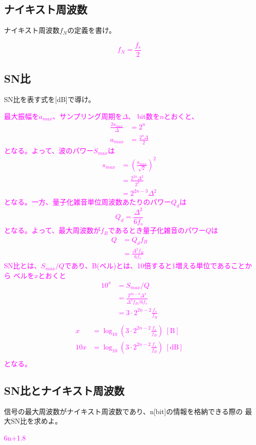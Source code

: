 \documentclass[twocolumn]{ltjsarticle}
\newcommand{\visible}{visible}
\newcommand{\ans}[1]{
\begin{tcolorbox}[\visible]
\textcolor{magenta}{#1}
\end{tcolorbox}
}
\begin{document}
\subsection{ナイキスト周波数}
ナイキスト周波数$f_N$の定義を書け。
\ans{$$f_N=\frac{f_s}{2}$$}
\subsection{SN比}
SN比を表す式を[dB]で導け。
\ans{
    最大振幅を$a_{max}$、サンプリング周期を$\Delta$、
    bit数を$n$とおくと、
    \begin{align*}
        \frac{2a_{max}}{\Delta}&=2^n\\
        a_{max}&=\frac{2^n\Delta}{2}
    \end{align*}
    となる。よって、波のパワー$S_{max}$は
    \begin{align*}
        s_{max}&=\left(\frac{a_{max}}{\sqrt{2}}\right)^2\\
        &=\frac{2^{2n}\Delta^2}{2^3}\\
        &=2^{2n-3}\Delta^2
    \end{align*}
    となる。一方、量子化雑音単位周波数あたりのパワー$Q_d$は
    $$Q_d=\frac{\Delta^2}{6f_s}$$
    となる。よって、最大周波数が$f_B$であるとき量子化雑音のパワー$Q$は
    \begin{align*}
        Q&=Q_df_B\\
        &=\frac{\Delta^2f_B}{6f_s}
    \end{align*}
    SN比とは、$S_{max}/Q$であり、B(ベル)とは、10倍すると1増える単位であることから
    ベルを$x$とおくと
    \begin{align*}
        10^x&=S_{max}/Q\\
        &=\frac{2^{2n-3}\Delta^2}{{\Delta^2f_B}/{6f_s}}\\
        &=3\cdot2^{2n-2}\frac{f_s}{f_B}\\
    \end{align*}
    \begin{align*}
        x&=\log_{10}\left(3\cdot2^{2n-2}\frac{f_s}{f_B}\right) \; [\mathrm{B}]\\
        10x&=\log_{10}\left(3\cdot2^{2n-2}\frac{f_s}{f_B}\right) \; [\mathrm{dB}]\\
    \end{align*}
    となる。
}
\subsection{SN比とナイキスト周波数}
信号の最大周波数がナイキスト周波数であり、n[bit]の情報を格納できる際の
最大SN比を求めよ。
\ans{
    6n+1.8
}

\nocite{*}
\printbibliography
\end{document}

